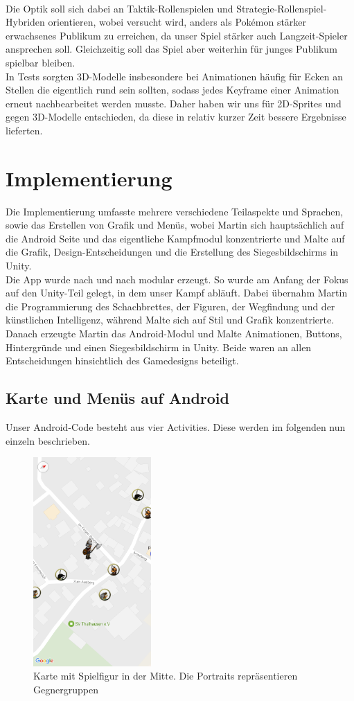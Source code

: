 \documentclass[extern,palatino]{cgBA}
\begin{document}
\\Die Optik soll sich dabei an Taktik-Rollenspielen und Strategie-Rollenspiel-Hybriden orientieren, wobei versucht wird, anders als Pokémon stärker erwachsenes Publikum zu erreichen, da unser Spiel stärker auch Langzeit-Spieler ansprechen soll. Gleichzeitig soll das Spiel aber weiterhin für junges Publikum spielbar bleiben.
\\In Tests sorgten 3D-Modelle insbesondere bei Animationen häufig für Ecken an Stellen die eigentlich rund sein sollten, sodass jedes Keyframe einer Animation erneut nachbearbeitet werden musste. Daher haben wir uns für 2D-Sprites und gegen 3D-Modelle entschieden, da diese in relativ kurzer Zeit bessere Ergebnisse lieferten.
\newpage
\section{Implementierung}
Die Implementierung umfasste mehrere verschiedene Teilaspekte und Sprachen, sowie das Erstellen von Grafik und Menüs, wobei Martin sich hauptsächlich auf die Android Seite und das eigentliche Kampfmodul konzentrierte und Malte auf die Grafik, Design-Entscheidungen und die Erstellung des Siegesbildschirms in Unity.
\\Die App wurde nach und nach modular erzeugt. So wurde am Anfang der Fokus auf den Unity-Teil gelegt, in dem unser Kampf abläuft. Dabei übernahm Martin die Programmierung des Schachbrettes, der Figuren, der Wegfindung und der künstlichen Intelligenz, während Malte sich auf Stil und Grafik konzentrierte. Danach erzeugte Martin das Android-Modul und Malte Animationen, Buttons, Hintergründe und einen Siegesbildschirm in Unity. Beide waren an allen Entscheidungen hinsichtlich des Gamedesigns beteiligt.
\subsection{Karte und Menüs auf Android}
Unser Android-Code besteht aus vier Activities. Diese werden im folgenden nun einzeln beschrieben.
\begin{figure}[H] 
		\centering
		\includegraphics[width=0.4\textwidth]{map.png}
		\caption{Karte mit Spielfigur in der Mitte. Die Portraits repräsentieren
			Gegnergruppen}
		\label{fig:Bild1}
\end{figure}
\end{document}
